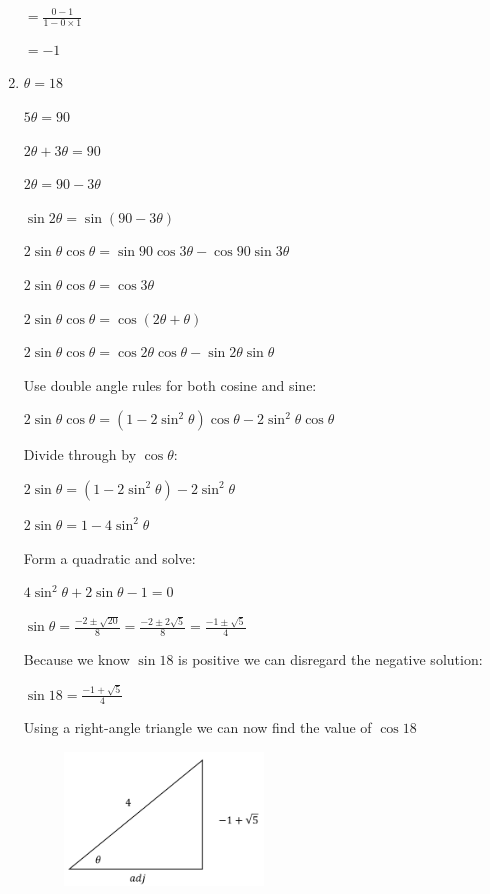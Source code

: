\documentclass[../main.tex]{subfiles}
\begin{document}
\begin{enumerate}[itemsep=0.4cm]
    $=\frac{0-1}{1-0\times 1}$

    $=-1$

    \item 
    $\theta = 18$

    $5\theta = 90$

    $2\theta +3\theta = 90$

    $2\theta = 90 - 3\theta$

    $\sin{2\theta}=\sin{(90 - 3\theta)}$

    $2\sin{\theta}\cos{\theta}=\sin{90}\cos{3\theta}-\cos{90}\sin{3\theta}$

    $2\sin{\theta}\cos{\theta}=\cos{3\theta}$

    $2\sin{\theta}\cos{\theta}=\cos{(2\theta + \theta)}$

    $2\sin{\theta}\cos{\theta}=\cos{2\theta}\cos{\theta}-\sin{2\theta}\sin{\theta}$

    Use double angle rules for both cosine and sine:

    $2\sin{\theta}\cos{\theta}=(1-2\sin^2{\theta})\cos{\theta}-2\sin^2{\theta}\cos{\theta}$

    Divide through by $\cos{\theta}$:

    $2\sin{\theta}=(1-2\sin^2{\theta})-2\sin^2{\theta}$

    $2\sin{\theta}=1-4\sin^2{\theta}$

    Form a quadratic and solve:

    $4\sin^2{\theta}+2\sin{\theta}-1=0$

    $\sin{\theta}=\frac{-2\pm \sqrt{20}}{8}=\frac{-2\pm 2\sqrt{5}}{8}=\frac{-1\pm \sqrt{5}}{4}$

    Because we know $\sin{18}$ is positive we can disregard the negative solution:

    $\sin{18}=\frac{-1+\sqrt{5}}{4}$

    Using a right-angle triangle we can now find the value of $\cos{18}$

    \begin{figure}[h]
        \centering
        \includegraphics[width=0.5\textwidth]{images/exacttrigvalues11.png}
    \end{figure}


\end{enumerate}
\end{document}
